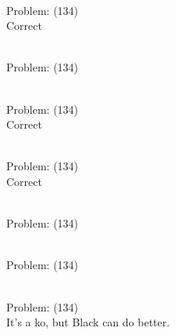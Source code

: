 \documentclass[11pt]{article}
\begin{document}
\begin{minipage}[t]{0.5\textwidth}
  {\centering
  
\\
Problem: (134)\\
Correct\\
  }
\end{minipage}
\begin{minipage}[t]{0.5\textwidth}
  {\centering
  
\\
Problem: (134)\\
  }
\end{minipage}
\begin{minipage}[t]{0.5\textwidth}
  {\centering
  
\\
Problem: (134)\\
Correct\\
  }
\end{minipage}
\begin{minipage}[t]{0.5\textwidth}
  {\centering
  
\\
Problem: (134)\\
Correct\\
  }
\end{minipage}
\begin{minipage}[t]{0.5\textwidth}
  {\centering
  
\\
Problem: (134)\\
  }
\end{minipage}
\begin{minipage}[t]{0.5\textwidth}
  {\centering
  
\\
Problem: (134)\\
  }
\end{minipage}
\begin{minipage}[t]{0.5\textwidth}
  {\centering
  
\\
Problem: (134)\\
It's a ko, but Black can do better.\\
  }
\end{minipage}
\end{document}
